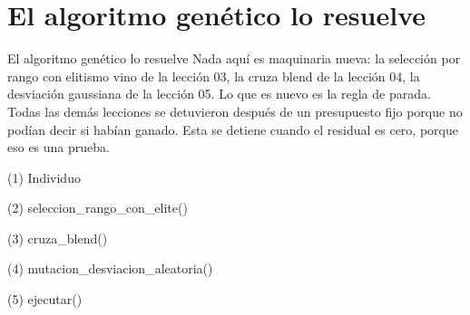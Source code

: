 
\section{El algoritmo genético lo resuelve}

\begin{frame}{El algoritmo genético lo resuelve}
Nada aquí es maquinaria nueva: la selección por rango con elitismo vino de la lección 03,
la cruza blend de la lección 04, la desviación gaussiana de la lección 05. Lo que es nuevo
es la regla de parada. Todas las demás lecciones se detuvieron después de un presupuesto fijo porque
no podían decir si habían ganado. Esta se detiene cuando el residual es cero,
porque eso es una prueba.
\end{frame}

\begin{frame}[fragile]{(1) Individuo}

\end{frame}

\begin{frame}[fragile]{(2) seleccion\_rango\_con\_elite()}

\end{frame}

\begin{frame}[fragile]{(3) cruza\_blend()}

\end{frame}

\begin{frame}[fragile]{(4) mutacion\_desviacion\_aleatoria()}

\end{frame}

\begin{frame}[fragile]{(5) ejecutar()}

\end{frame}

